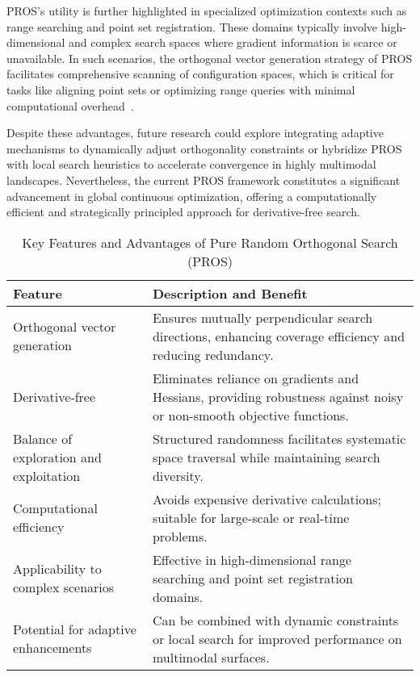 \documentclass[sigconf]{acmart}
\begin{document}
PROS’s utility is further highlighted in specialized optimization contexts such as range searching and point set registration. These domains typically involve high-dimensional and complex search spaces where gradient information is scarce or unavailable. In such scenarios, the orthogonal vector generation strategy of PROS facilitates comprehensive scanning of configuration spaces, which is critical for tasks like aligning point sets or optimizing range queries with minimal computational overhead~\cite{ref8}.

Despite these advantages, future research could explore integrating adaptive mechanisms to dynamically adjust orthogonality constraints or hybridize PROS with local search heuristics to accelerate convergence in highly multimodal landscapes. Nevertheless, the current PROS framework constitutes a significant advancement in global continuous optimization, offering a computationally efficient and strategically principled approach for derivative-free search.

\begin{table*}[htbp]
\centering
\caption{Key Features and Advantages of Pure Random Orthogonal Search (PROS)}
\label{tab:pros_features}
\begin{adjustbox}{max width=\textwidth}
\begin{tabular}{@{}ll@{}}
\toprule
\textbf{Feature} & \textbf{Description and Benefit} \\
\toprule
Orthogonal vector generation & Ensures mutually perpendicular search directions, enhancing coverage efficiency and reducing redundancy. \\
Derivative-free & Eliminates reliance on gradients and Hessians, providing robustness against noisy or non-smooth objective functions. \\
Balance of exploration and exploitation & Structured randomness facilitates systematic space traversal while maintaining search diversity. \\
Computational efficiency & Avoids expensive derivative calculations; suitable for large-scale or real-time problems. \\
Applicability to complex scenarios & Effective in high-dimensional range searching and point set registration domains. \\
Potential for adaptive enhancements & Can be combined with dynamic constraints or local search for improved performance on multimodal surfaces. \\
\bottomrule
\end{tabular}
\end{adjustbox}
\end{table*}
\end{document}
